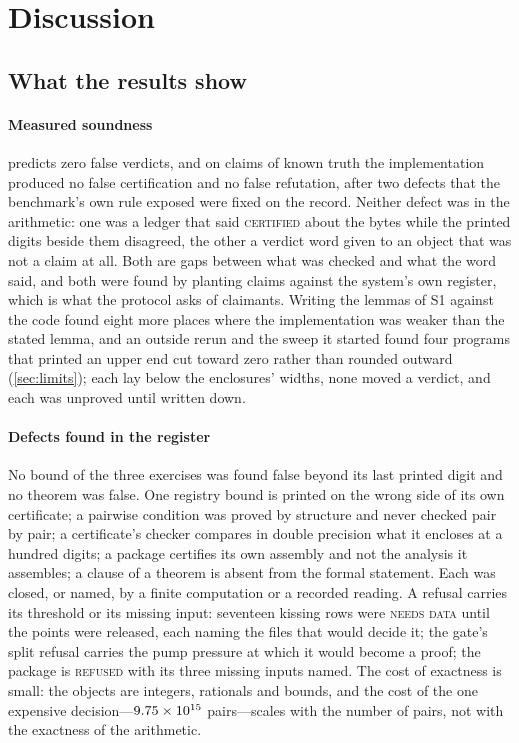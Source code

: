 \documentclass[preprint,11pt,a4paper]{elsarticle}
\theoremstyle{definition}
\newcommand{\verdict}[1]{\textup{\textsc{#1}}}
\newcommand{\CERT}{\verdict{certified}}
\newcommand{\REFS}{\verdict{refused}}
\newcommand{\supp}[1]{S#1}
\begin{document}
\section{Discussion}\label{sec:discussion}

\subsection{What the results show}

\paragraph{Measured soundness}
 predicts zero false verdicts, and on \MtSaMutants{} claims of known truth the implementation produced no false certification and no false refutation, after two defects that the benchmark's own rule exposed were fixed on the record. Neither defect was in the arithmetic: one was a ledger that said \CERT{} about the bytes while the printed digits beside them disagreed, the other a verdict word given to an object that was not a claim at all. Both are gaps between what was checked and what the word said, and both were found by planting claims against the system's own register, which is what the protocol asks of claimants. Writing the lemmas of \supp{1} against the code found eight more places where the implementation was weaker than the stated lemma, and an outside rerun and the sweep it started found four programs that printed an upper end cut toward zero rather than rounded outward (\cref{sec:limits}); each lay below the enclosures' widths, none moved a verdict, and each was unproved until written down.

\paragraph{Defects found in the register}
No bound of the three exercises was found false beyond its last printed digit and no theorem was false. One registry bound is printed on the wrong side of its own certificate; a pairwise condition was proved by structure and never checked pair by pair; a certificate's checker compares in double precision what it encloses at a hundred digits; a package certifies its own assembly and not the analysis it assembles; a clause of a theorem is absent from the formal statement. Each was closed, or named, by a finite computation or a recorded reading. A refusal carries its threshold or its missing input: seventeen kissing rows were \verdict{needs data} until the points were released, each naming the files that would decide it; the gate's split refusal carries the pump pressure at which it would become a proof; the package is \REFS{} with its three missing inputs named. The cost of exactness is small: the objects are integers, rationals and bounds, and the cost of the one expensive decision---$9.75 \times 10^{15}$ pairs---scales with the number of pairs, not with the exactness of the arithmetic.
\end{document}
